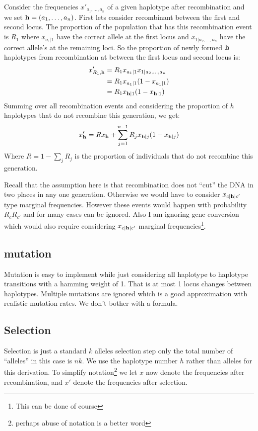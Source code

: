 \documentclass{article}
\begin{document}
Consider the frequencies $x'_{a_1,\ldots,a_n}$ of a given haplotype after
recombination and we set $\mathbf{h}=(a_1,\ldots,a_n)$. First lets consider
recombinant between the first and second locus. The proportion of the population that has this recombination event is
$R_1$ where $x_{a_1|1}$ have the correct allele at the first locus and
$x_{1|a_2,\ldots,a_n}$ have the correct allele's at the remaining loci. So the
proportion of newly formed $\mathbf{h}$ haplotypes from recombination at between the
first locus and second locus is:
\begin{align}
	x'_{R_1,\mathbf{h}}&=R_1 x_{a_1|1} x_{1|a_2,\ldots,a_n} \\
	&=R_1 x_{a_1|1} (1-x_{a_1|1}) \\
	&=R_1 x_{\mathbf{h}|1} (1-x_{\mathbf{h}|1})
\end{align}
Summing over all recombination events and considering the proportion of $h$
haplotypes that do not recombine this generation, we get:
\begin{align}
	x'_{\mathbf{h}}=R x_{\mathbf{h}}+\sum_{j=1}^{n-1} R_j x_{\mathbf{h}|j} (1-x_{\mathbf{h}|j})
\end{align}
Where $R=1-\sum_j R_j$ is the proportion of individuals that do not recombine
this generation. 

Recall that the assumption here is that recombination does not  ``cut'' the DNA
in two places in any one generation. Otherwise we would have to consider
$x_{c|\mathbf{h}|c'}$ type marginal frequencies. However these events would happen
with probability $R_cR_{c'}$ and for many cases can be ignored. Also I am ignoring
gene conversion which would also require considering $x_{c|\mathbf{h}|c'}$ marginal
frequencies\footnote{This can be done of course}.

\subsection{mutation}

Mutation is easy to implement while just considering all haplotype to haplotype
transitions with a hamming weight of 1. That is at most 1 locus changes between
haplotypes. Multiple mutations are ignored which is a good approximation with
realistic mutation rates. We don't bother with a formula. 


\subsection{Selection}

Selection is just a standard $k$ alleles selection step only the total number
of ``alleles'' in this case is $nk$. We use the haplotype number $h$ rather
than alleles for this derivation. To simplify notation\footnote{perhaps abuse
of notation is a better word} we let $x$ now denote the  frequencies after
recombination, and $x'$ denote the frequencies after selection. 
\end{document}
